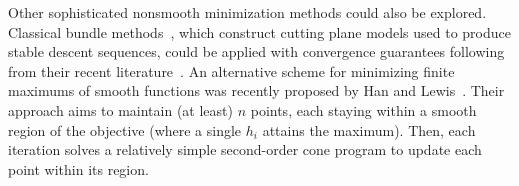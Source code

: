\documentclass[sn-mathphys,Numbered]{sn-jnl}%
\newcommand{\hypo}{\text{hypo }}
\newtheorem{theorem}{Theorem}%
\newtheorem{lemma}[theorem]{Lemma}%
\begin{document}
Other sophisticated nonsmooth minimization methods could also be explored. Classical bundle methods~\cite{Lemarechal1975,Wolfe1975}, which construct cutting plane models used to produce stable descent sequences, could be applied with convergence guarantees following from their recent literature~\cite{Lan2015,Du2017,Liang2021,atenas2023unified,diaz2023optimal}. An alternative scheme for minimizing finite maximums of smooth functions was recently proposed by Han and Lewis~\cite{han2023survey}. Their approach aims to maintain  (at least) $n$ points, each staying within a smooth region of the objective (where a single $h_i$ attains the maximum). Then, each iteration solves a relatively simple second-order cone program to update each point within its region.


\end{document}
